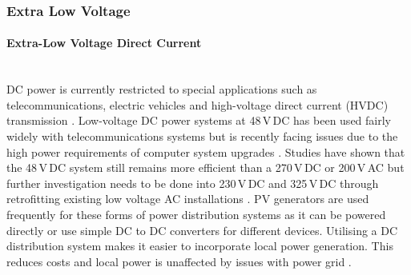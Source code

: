 

\subsubsection{Extra Low Voltage}

\paragraph{Extra-Low Voltage Direct Current}
~\\
DC power is currently restricted to special applications such as telecommunications, electric vehicles and high-voltage direct current (HVDC) transmission \cite{Salomonsson2007}. Low-voltage DC power systems at 48\,V\,DC has been used fairly widely with telecommunications systems but is recently facing issues due to the high power requirements of computer system upgrades \cite{Salomonsson2007}. Studies have shown that the 48\,V\,DC system still remains more efficient than a 270\,V\,DC or 200\,V\,AC but further investigation needs to be done into 230\,V\,DC and 325\,V\,DC through retrofitting existing low voltage AC installations \cite{Salomonsson2007}. PV generators are used frequently for these forms of power distribution systems as it can be powered directly or use simple DC to DC converters for different devices. Utilising a DC distribution system makes it easier to incorporate local power generation. This reduces costs and local power is unaffected by issues with power grid \cite{Starke2008a}. 

